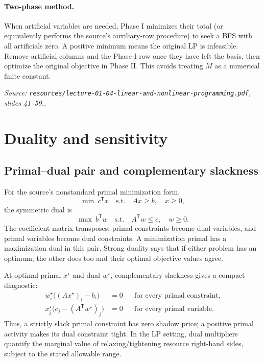 \documentclass[11pt,a4paper]{article}
\renewcommand{\texttt}[1]{\nolinkurl{#1}}
\newcommand{\T}{\mathsf{T}}
\newcommand{\source}[1]{\par\smallskip\noindent\textit{Source: #1.}\par\smallskip}
\begin{document}
\paragraph{Two-phase method.} When artificial variables are needed, Phase I minimizes their total (or equivalently performs the source's auxiliary-row procedure) to seek a BFS with all artificials zero. A positive minimum means the original LP is infeasible. Remove artificial columns and the Phase-I row once they have left the basis, then optimize the original objective in Phase II. This avoids treating $M$ as a numerical finite constant.
\source{\texttt{resources/lecture-01-04-linear-and-nonlinear-programming.pdf}, slides 41--59.}

\section{Duality and sensitivity}
\subsection{Primal--dual pair and complementary slackness}
For the source's nonstandard primal minimization form,
\begin{equation}
 \min\ c^\T x\quad\text{s.t.}\quad Ax\geq b,\quad x\geq0,
\end{equation}
the symmetric dual is
\begin{equation}
 \max\ b^\T w\quad\text{s.t.}\quad A^\T w\leq c,\quad w\geq0.
\end{equation}
The coefficient matrix transposes; primal constraints become dual variables, and primal variables become dual constraints.  A minimization primal has a maximization dual in this pair. Strong duality says that if either problem has an optimum, the other does too and their optimal objective values agree.

At optimal primal $x^\star$ and dual $w^\star$, complementary slackness gives a compact diagnostic:
\begin{align*}
 w_i^\star\big((Ax^\star)_i-b_i\big)&=0 &&\text{for every primal constraint},\\
 x_j^\star\big(c_j-(A^\T w^\star)_j\big)&=0 &&\text{for every primal variable}.
\end{align*}
Thus, a strictly slack primal constraint has zero shadow price; a positive primal activity makes its dual constraint tight. In the LP setting, dual multipliers quantify the marginal value of relaxing/tightening resource right-hand sides, subject to the stated allowable range.
\end{document}
